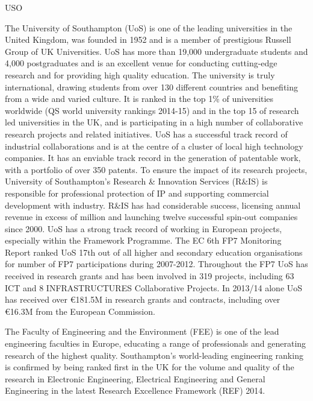 \begin{sitedescription}{USO}





The University of Southampton (UoS) is one of the leading universities
in the United Kingdom, was founded in 1952 and is a member of
prestigious Russell Group of UK Universities. UoS has more than 19,000
undergraduate students and 4,000 postgraduates and is an excellent
venue for conducting cutting-edge research and for providing high
quality education. The university is truly international, drawing
students from over 130 different countries and benefiting from a wide
and varied culture. It is ranked in the top 1\% of universities
worldwide (QS world university rankings 2014-15) and in the top 15 of
research led universities in the UK, and is participating in a high
number of collaborative research projects and related initiatives. UoS
has a successful track record of industrial collaborations and is at
the centre of a cluster of local high technology companies. It has an
enviable track record in the generation of patentable work, with a
portfolio of over 350 patents. To ensure the impact of its research
projects, University of Southampton’s Research \& Innovation Services
(R\&IS) is responsible for professional protection of IP and supporting
commercial development with industry. R\&IS has had considerable
success, licensing annual revenue in excess of million and launching
twelve successful spin-out companies since 2000.  UoS has a strong
track record of working in European projects, especially within the
Framework Programme. The EC 6th FP7 Monitoring Report ranked UoS 17th
out of all higher and secondary education organisations for number of
FP7 participations during 2007-2012. Throughout the FP7 UoS has
received  in research grants and has been involved in 319
projects, including 63 ICT and 8 INFRASTRUCTURES Collaborative Projects. In 2013/14
alone UoS has received over \euro181.5M in research grants and contracts,
including over \euro16.3M from the European Commission.

The Faculty of Engineering and the Environment (FEE) is one of the
lead engineering faculties in Europe, educating a range of
professionals and generating research of the highest
quality. Southampton's world-leading engineering ranking is confirmed
by being ranked first in the UK for the volume and quality of the
research in Electronic Engineering, Electrical Engineering and
General Engineering in the latest Research Excellence Framework (REF)
2014.


\end{sitedescription}
